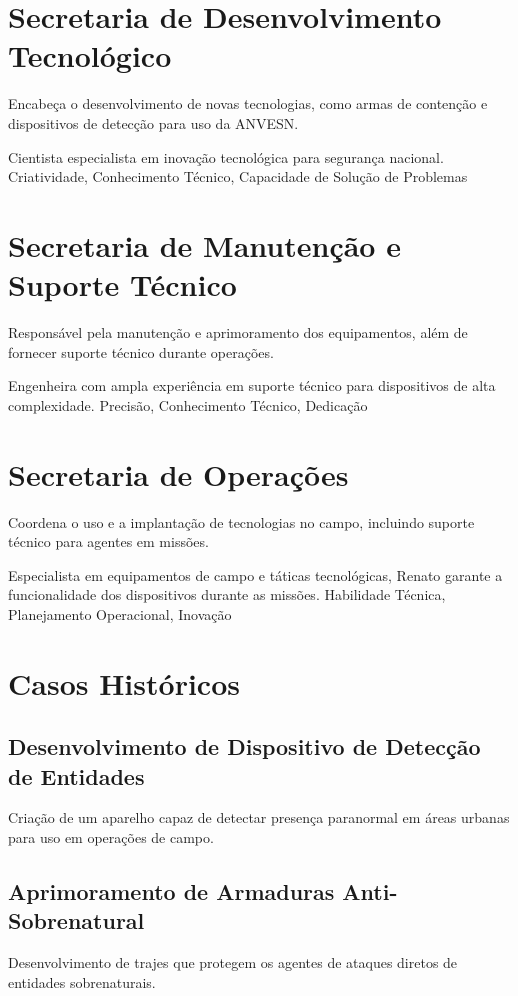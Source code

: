 \section{Secretaria de Desenvolvimento Tecnológico}
Encabeça o desenvolvimento de novas tecnologias, como armas de contenção e dispositivos de detecção para uso da ANVESN.

{Cientista especialista em inovação tecnológica para segurança nacional.}
{Criatividade, Conhecimento Técnico, Capacidade de Solução de Problemas}

\section{Secretaria de Manutenção e Suporte Técnico}
Responsável pela manutenção e aprimoramento dos equipamentos, além de fornecer suporte técnico durante operações.

{Engenheira com ampla experiência em suporte técnico para dispositivos de alta complexidade.}
{Precisão, Conhecimento Técnico, Dedicação}

\section{Secretaria de Operações}
Coordena o uso e a implantação de tecnologias no campo, incluindo suporte técnico para agentes em missões.

{Especialista em equipamentos de campo e táticas tecnológicas, Renato garante a funcionalidade dos dispositivos durante as missões.}
{Habilidade Técnica, Planejamento Operacional, Inovação}

\section{Casos Históricos}

\subsection{Desenvolvimento de Dispositivo de Detecção de Entidades} Criação de um aparelho capaz de detectar presença paranormal em áreas urbanas para uso em operações de campo.

\subsection{Aprimoramento de Armaduras Anti-Sobrenatural} Desenvolvimento de trajes que protegem os agentes de ataques diretos de entidades sobrenaturais.



